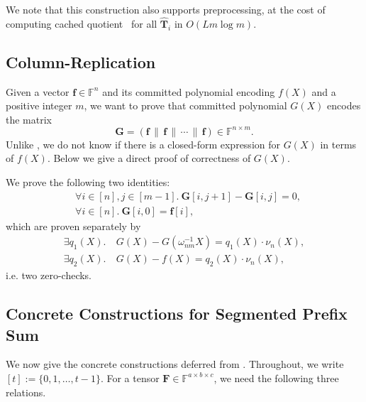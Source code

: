 We note that this construction also supports preprocessing,
  at the cost of computing cached quotient~\cite{cq22}
  for all $\widehat{\mathbf{T}}_i$ in $O(Lm\log m)$.

\subsection{Column-Replication}\label{app:replication}
Given a vector $\mathbf{f}\in\mathbb{F}^n$ and
  its committed polynomial encoding $f(X)$ and a positive integer $m$,
  we want to prove
  that committed polynomial $G(X)$ encodes the matrix
  \[
    \mathbf{G} = (\mathbf{f}\,\|\,\mathbf{f}\,\|\,\cdots\,\|\,\mathbf{f}) \in \mathbb{F}^{n\times m}.
  \]
  Unlike , we do not know if there
  is a closed-form expression for $G(X)$ in terms of $f(X)$.
  Below we give a direct proof of correctness of $G(X)$.

We prove the following two identities:
\begin{align}
    &\forall i\in[n], j\in[m-1].\ \mathbf{G}[i, j+1] - \mathbf{G}[i, j] = 0,\\
    &\forall i\in [n].\ \mathbf{G}[i, 0] = \mathbf{f}[i],
\end{align}
which are proven separately by
\begin{align}
  \exists q_1(X).&\
  G(X) - G(\omega_{nm}^{-1}X) = q_1(X)\cdot \nu_n(X),\\
  \exists q_2(X).&\
  G(X) - f(X) = q_2(X)\cdot \nu_n(X),
\end{align}
i.e. two zero-checks.

\subsection{Concrete Constructions for Segmented Prefix Sum}\label{app:prefix-sum}

We now give the concrete constructions deferred from
. Throughout, we write
$[t]:=\{0,1,\dots,t-1\}$.
For a tensor $\mathbf{F}\in\mathbb{F}^{a\times b\times c}$,
we need the following three relations.


